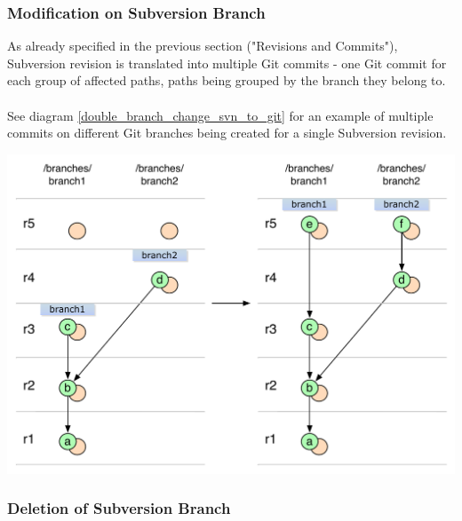 \subsubsection{Modification on Subversion Branch}

As already specified in the previous section ("Revisions and Commits"), Subversion
revision is translated into multiple Git commits - one Git commit for each group of 
affected paths, paths being grouped by the branch they belong to.
\\\\
See diagram \ref{double_branch_change_svn_to_git} for an example of multiple commits 
on different Git branches being created for a single Subversion revision.

\begin{center}
\includegraphics[width=\textwidth]{img/diagrams/double_branch_change_svn_to_git.pdf}%
\label{double_branch_change_svn_to_git}%
\end{center}

\subsubsection{Deletion of Subversion Branch}

